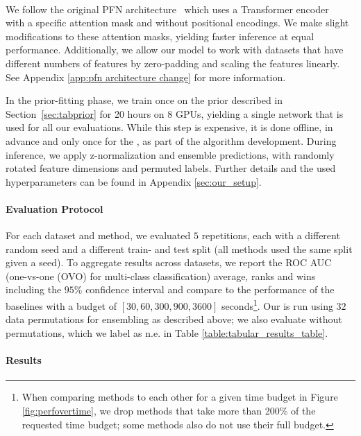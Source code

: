 \documentclass{article}
\begin{document}
\paragraph{\methodname{}} We follow the original PFN architecture~\citep{muller-iclr22a} which uses a Transformer encoder~\citep{vaswani-neurips17a} with a specific attention mask and without positional encodings. We make slight modifications to these attention masks, yielding faster inference at equal performance.
Additionally, we allow our model to work with datasets that have different numbers of features by zero-padding and scaling the features linearly.
See Appendix \ref{app:pfn architecture change} for more information.

In the prior-fitting phase, we train \methodname{} once on the prior described in Section~\ref{sec:tabprior} for 20 hours on 8 GPUs, yielding a single network that is used for all our evaluations.
While this step is expensive, it is done offline, in advance and only once for the \methodname{}, as part of the algorithm development.
During inference, we apply z-normalization and ensemble predictions, with randomly rotated feature dimensions and permuted labels.
Further details and the used hyperparameters can be found in Appendix \ref{sec:our_setup}.

\paragraph{Evaluation Protocol} For each dataset and method, we evaluated $5$ repetitions, each with a different random seed and a different train- and test split (all methods used the same split given a seed). To aggregate results across datasets, we report the ROC AUC (one-vs-one (OVO) for multi-class classification) average, ranks and wins including the $95\%$ confidence interval and compare to the performance of the baselines with a budget of $[30, 60, 300, 900, 3600]$ seconds\footnote{When comparing methods to each other for a given time budget in Figure \ref{fig:perfovertime}, we drop methods that take more than 200\% of the requested time budget; some methods also do not use their full budget.}. Our \methodname{} is run using $32$ data permutations for ensembling as described above; we also evaluate \methodname{} without permutations, which we label as \methodname{} n.e. in Table \ref{table:tabular_results_table}.%

\paragraph{Results}
%
\end{document}
